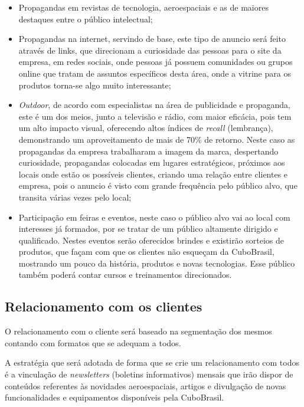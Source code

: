 \documentclass[
	12pt,				%
	openright,			%
	oneside,			%
	a4paper,			%
	english,			%
	french,				%
	spanish,			%
	brazil				%
	]{abntex2}
\begin{document}
	\begin{itemize}
		\item Propagandas em revistas de tecnologia, aeroespaciais e as de maiores destaques entre o público intelectual;
		\item Propagandas na internet, servindo de base, este tipo de anuncio será feito através de links, que direcionam a curiosidade das pessoas para o site da empresa, em redes sociais, onde pessoas já possuem comunidades ou grupos online que tratam de assuntos específicos desta área, onde a vitrine para os produtos torna-se algo muito interessante;
		\item \textit{Outdoor}, de acordo com especialistas na área de publicidade e propaganda, este é um dos meios, junto a televisão e rádio, com maior eficácia, pois tem um alto impacto visual, oferecendo altos índices de \textit{recall} (lembrança), demonstrando um aproveitamento de mais de 70\% de retorno. Neste caso as propagandas da empresa trabalharam a imagem da marca, despertando curiosidade, propagandas colocadas em lugares estratégicos, próximos aos locais onde estão os possíveis clientes, criando uma relação entre clientes e empresa, pois o anuncio é visto com grande frequência pelo público alvo, que transita várias vezes pelo local;
		\item Participação em feiras e eventos, neste caso o público alvo vai ao local com interesses já formados, por se tratar de um público altamente dirigido e qualificado. Nestes eventos serão oferecidos brindes e existirão sorteios de produtos, que façam com que os clientes não esqueçam da CuboBrasil, mostrando um pouco da história, produtos e novas tecnologias. Esse público também poderá contar cursos e treinamentos direcionados.	
	\end{itemize}

\subsection[Relacionamento com os clientes]{Relacionamento com os clientes}
	
	O relacionamento com o cliente será baseado na segmentação dos mesmos contando com formatos que se adequam a todos.
	 
	A estratégia que será adotada de forma que se crie um relacionamento com todos é a vinculação de \textit{newsletters} (boletins informativos) mensais que irão dispor de conteúdos referentes às novidades aeroespaciais, artigos e divulgação de novas funcionalidades e equipamentos disponíveis pela CuboBrasil.
\end{document}
